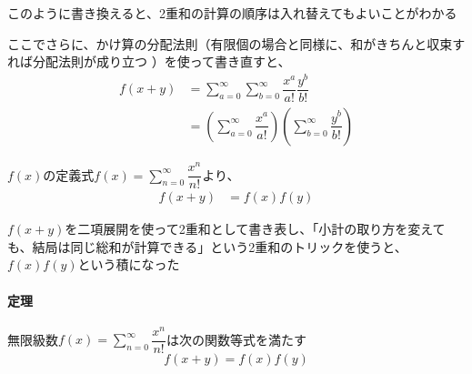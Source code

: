 \documentclass[../book_jiriki_calc]{subfiles}
\begin{document}
このように書き換えると、2重和の計算の順序は入れ替えてもよいことがわかる

\sectionline

ここでさらに、かけ算の分配法則（有限個の場合と同様に、和がきちんと収束すれば分配法則が成り立つ
）を使って書き直すと、
\begin{align}
  f(x+y) & = \sum_{a=0}^{\infty} \sum_{b=0}^{\infty} \dfrac{x^a}{a!} \dfrac{y^b}{b!}                           \\
         & = \left(\sum_{a=0}^{\infty} \dfrac{x^a}{a!}\right) \left(\sum_{b=0}^{\infty} \dfrac{y^b}{b!}\right)
\end{align}

$f(x)$の定義式$\displaystyle f(x) = \sum_{n=0}^{\infty} \dfrac{x^n}{n!}$より、
\begin{align}
  f(x+y) & = f(x)f(y)
\end{align}

$f(x+y)$を二項展開を使って2重和として書き表し、「小計の取り方を変えても、結局は同じ総和が計算できる」という2重和のトリックを使うと、$f(x)f(y)$という積になった

\sectionline

\paragraph{定理}

無限級数$\displaystyle f(x) = \sum_{n=0}^{\infty} \dfrac{x^n}{n!}$は次の関数等式を満たす
\begin{equation}
  f(x+y) = f(x)f(y)
\end{equation}

\sectionline
\end{document}
